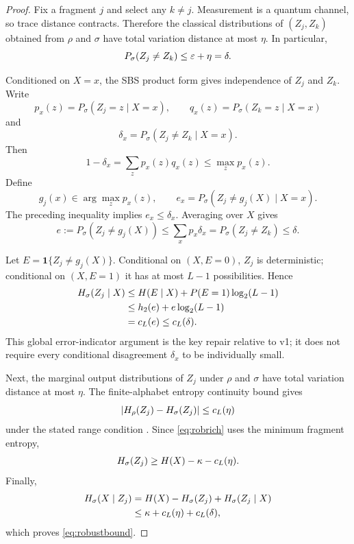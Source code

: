 \begin{proof}
Fix a fragment $j$ and select any $k\ne j$. Measurement is a quantum channel, so trace distance contracts. Therefore the classical distributions of $(Z_j,Z_k)$ obtained from $\rho$ and $\sigma$ have total variation distance at most $\eta$. In particular,
\begin{equation}
P_\sigma(Z_j\ne Z_k)\le\varepsilon+\eta=\delta.
\label{eq:sigmadis}
\end{equation}

Conditioned on $X=x$, the SBS product form gives independence of $Z_j$ and $Z_k$. Write
\[
p_x(z)=P_\sigma(Z_j=z\mid X=x),\qquad
q_x(z)=P_\sigma(Z_k=z\mid X=x)
\]
and
\[
\delta_x=P_\sigma(Z_j\ne Z_k\mid X=x).
\]
Then
\[
1-\delta_x=\sum_zp_x(z)q_x(z)\le\max_zp_x(z).
\]
Define
\[
g_j(x)\in\arg\max_zp_x(z),\qquad
e_x=P_\sigma(Z_j\ne g_j(X)\mid X=x).
\]
The preceding inequality implies $e_x\le\delta_x$. Averaging over $X$ gives
\begin{equation}
e:=P_\sigma(Z_j\ne g_j(X))\le\sum_xp_x\delta_x=P_\sigma(Z_j\ne Z_k)\le\delta.
\label{eq:globalerror}
\end{equation}

Let $E=\mathbf 1\{Z_j\ne g_j(X)\}$. Conditional on $(X,E=0)$, $Z_j$ is deterministic; conditional on $(X,E=1)$ it has at most $L-1$ possibilities. Hence
\begin{align}
H_\sigma(Z_j\mid X)
&\le H(E\mid X)+P(E=1)\log_2(L-1)\\
&\le h_2(e)+e\log_2(L-1)\\
&=c_L(e)\le c_L(\delta).
\label{eq:fanoish}
\end{align}
This global error-indicator argument is the key repair relative to v1; it does not require every conditional disagreement $\delta_x$ to be individually small.

Next, the marginal output distributions of $Z_j$ under $\rho$ and $\sigma$ have total variation distance at most $\eta$. The finite-alphabet entropy continuity bound gives
\begin{equation}
|H_\rho(Z_j)-H_\sigma(Z_j)|\le c_L(\eta)
\label{eq:entropycont}
\end{equation}
under the stated range condition \cite{winter2016}. Since \cref{eq:robrich} uses the minimum fragment entropy,
\[
H_\sigma(Z_j)\ge H(X)-\kappa-c_L(\eta).
\]
Finally,
\begin{align}
H_\sigma(X\mid Z_j)
&=H(X)-H_\sigma(Z_j)+H_\sigma(Z_j\mid X)\\
&\le\kappa+c_L(\eta)+c_L(\delta),
\end{align}
which proves \cref{eq:robustbound}.
\end{proof}

